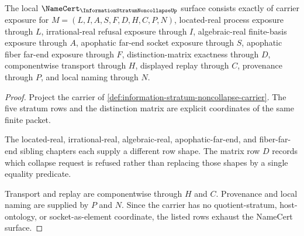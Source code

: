 \begin{theorem}
\label{thm:information-stratum-noncollapse-obligations}
The local $\NameCert_{\InformationStratumNoncollapseUp}$ surface consists exactly of carrier exposure for $M=(L,I,A,S,F,D,H,C,P,N)$, located-real process exposure through $L$, irrational-real refusal exposure through $I$, algebraic-real finite-basis exposure through $A$, apophatic far-end socket exposure through $S$, apophatic fiber far-end exposure through $F$, distinction-matrix exactness through $D$, componentwise transport through $H$, displayed replay through $C$, provenance through $P$, and local naming through $N$.
\end{theorem}
\begin{proof}
Project the carrier of \autoref{def:information-stratum-noncollapse-carrier}. The five stratum rows and the distinction matrix are explicit coordinates of the same finite packet.

The located-real, irrational-real, algebraic-real, apophatic-far-end, and fiber-far-end sibling chapters each supply a different row shape. The matrix row $D$ records which collapse request is refused rather than replacing those shapes by a single equality predicate.

Transport and replay are componentwise through $H$ and $C$. Provenance and local naming are supplied by $P$ and $N$. Since the carrier has no quotient-stratum, host-ontology, or socket-as-element coordinate, the listed rows exhaust the NameCert surface.
\end{proof}

